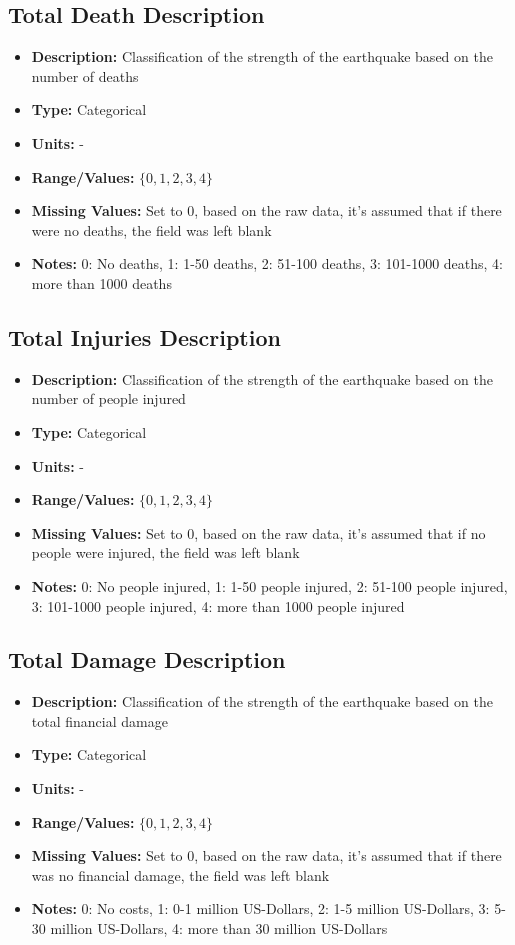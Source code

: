 \documentclass{article}
\begin{document}
\subsection{Total Death Description}
\begin{itemize}
    \item \textbf{Description:} Classification of the strength of the earthquake based on the number of deaths
    \item \textbf{Type:} Categorical
    \item \textbf{Units:} -
    \item \textbf{Range/Values:} $\{0,1,2,3,4 \}$
    \item \textbf{Missing Values:} Set to 0, based on the raw data, it's assumed that if there were no deaths, the field was left blank
    \item \textbf{Notes:} 0: No deaths, 1: 1-50 deaths, 2: 51-100 deaths, 3: 101-1000 deaths, 4: more than 1000 deaths
\end{itemize}

\subsection{Total Injuries Description}
\begin{itemize}
    \item \textbf{Description:} Classification of the strength of the earthquake based on the number of people injured
    \item \textbf{Type:} Categorical
    \item \textbf{Units:} -
    \item \textbf{Range/Values:} $\{0,1,2,3,4 \}$
    \item \textbf{Missing Values:} Set to 0, based on the raw data, it's assumed that if no people were injured, the field was left blank
    \item \textbf{Notes:} 0: No people injured, 1: 1-50 people injured, 2: 51-100 people injured, 3: 101-1000 people injured, 4: more than 1000 people injured
\end{itemize}

\subsection{Total Damage Description}
\begin{itemize}
    \item \textbf{Description:} Classification of the strength of the earthquake based on the total financial damage
    \item \textbf{Type:} Categorical
    \item \textbf{Units:} -
    \item \textbf{Range/Values:} $\{0,1,2,3,4 \}$
    \item \textbf{Missing Values:} Set to 0, based on the raw data, it's assumed that if there was no financial damage, the field was left blank
    \item \textbf{Notes:} 0: No costs, 1: 0-1 million US-Dollars, 2: 1-5 million US-Dollars, 3: 5-30 million US-Dollars, 4: more than 30 million US-Dollars
\end{itemize}
\end{document}
